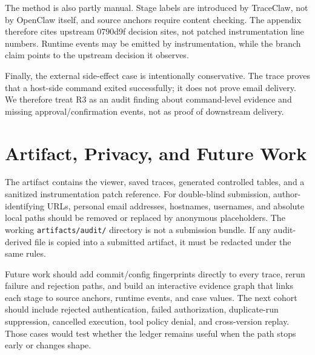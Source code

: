 \documentclass[11pt,a4paper]{article}
\begin{document}
The method is also partly manual. Stage labels are introduced by
TraceClaw, not by OpenClaw itself, and source anchors require content
checking. The appendix therefore cites upstream 0790d9f decision sites,
not patched instrumentation line numbers. Runtime events may be emitted
by instrumentation, while the branch claim points to the upstream
decision it observes.

Finally, the external side-effect case is intentionally conservative. The
trace proves that a host-side command exited successfully; it does not
prove email delivery. We therefore treat R3 as an audit finding about
command-level evidence and missing approval/confirmation events, not as
proof of downstream delivery.

\section{Artifact, Privacy, and Future Work}
\label{sec:artifact}

The artifact contains the viewer, saved traces, generated controlled
tables, and a sanitized instrumentation patch reference. For double-blind
submission, author-identifying URLs, personal email addresses, hostnames,
usernames, and absolute local paths should be removed or replaced by
anonymous placeholders. The working \texttt{artifacts/audit/} directory is
not a submission bundle. If any audit-derived file is copied into a
submitted artifact, it must be redacted under the same rules.

Future work should add commit/config fingerprints directly to every trace,
rerun failure and rejection paths, and build an interactive evidence graph
that links each stage to source anchors, runtime events, and case values.
The next cohort should include rejected authentication, failed
authorization, duplicate-run suppression, cancelled execution, tool
policy denial, and cross-version replay. Those cases would test whether
the ledger remains useful when the path stops early or changes shape.
\end{document}
